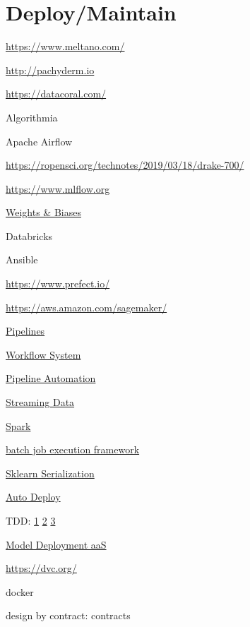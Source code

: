 \documentclass[]{book}
\begin{document}
\hypertarget{deploymaintain}{%
\section{Deploy/Maintain}\label{deploymaintain}}

\url{https://www.meltano.com/}

\url{http://pachyderm.io}

\url{https://datacoral.com/}

Algorithmia

Apache Airflow

\url{https://ropensci.org/technotes/2019/03/18/drake-700/}

\url{https://www.mlflow.org}

\href{https://www.wandb.com/blog/towards-reproducibility}{Weights \& Biases}

Databricks

Ansible

\url{https://www.prefect.io/}

\url{https://aws.amazon.com/sagemaker/}

\href{http://stat545.com/automation01_slides/\#/automating-data-analysis-pipelines}{Pipelines}

\href{https://snakemake.readthedocs.io/en/stable/}{Workflow System}

\href{http://stat545.com/automation01_slides/\#/automating-data-analysis-pipelines}{Pipeline Automation}

\href{https://www.wallaroolabs.com}{Streaming Data}

\href{https://docs.azuredatabricks.net/spark/latest/mllib/mllib-pipelines-and-stuctured-streaming.html}{Spark}

\href{https://stitchfix.github.io/flotilla-os/}{batch job execution framework}

\href{https://cmry.github.io/notes/serialize}{Sklearn Serialization}

\href{http://content.nexosis.com/twimlai}{Auto Deploy}

TDD: \href{http://engineering.pivotal.io/post/test-driven-development-for-data-science/}{1} \textbar{} \href{http://www.tdda.info/}{2} \textbar{} \href{http://stochasticsolutions.com/}{3}

\href{https://orchestrahq.com}{Model Deployment aaS}

\url{https://dvc.org/}

docker

design by contract: contracts
\end{document}
